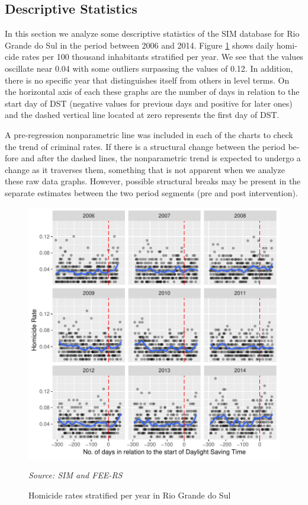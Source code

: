 \documentclass[12pt,openright,oneside,a4paper,english,french,spanish]{abntex2}
\numberwithin{table}{section} %
\numberwithin{figure}{section} %
\newcommand{\source}[1]{\textit{#1}}
\begin{document}
\begin{otherlanguage}{english}
\subsection{Descriptive Statistics\label{descritivas_HV}}

In this section we analyze some descriptive statistics of the SIM database for Rio Grande do Sul in the period between 2006 and 2014. Figure \ref{fig:taxas_homicidios_por_ano_RS} shows daily homicide rates per 100 thousand inhabitants stratified per year. We see that the values oscillate near 0.04 with some outliers surpassing the values of 0.12. In addition, there is no specific year that distinguishes itself from others in level terms. On the horizontal axis of each these graphs are the number of days in relation to the start day of DST (negative values for previous days and positive for later ones) and the dashed vertical line located at zero represents the first day of DST.

A pre-regression nonparametric line was included in each of the charts to check the trend of criminal rates. If there is a structural change between the period before and after the dashed lines, the nonparametric trend is expected to undergo a change as it traverses them, something that is not apparent when we analyze these raw data graphs. However, possible structural breaks may be present in the separate estimates between the two period segments (pre and post intervention).

\begin{figure}[H]
\begin{center}
\includegraphics{TESE_DE_DOUTORADO_RENAN_FINAL-plot1_HV}
\end{center}
\caption{Homicide rates stratified per year in Rio Grande do Sul}
\source{Source: SIM and FEE-RS}
\label{fig:taxas_homicidios_por_ano_RS}
\end{figure}


\end{otherlanguage}
\end{document}
